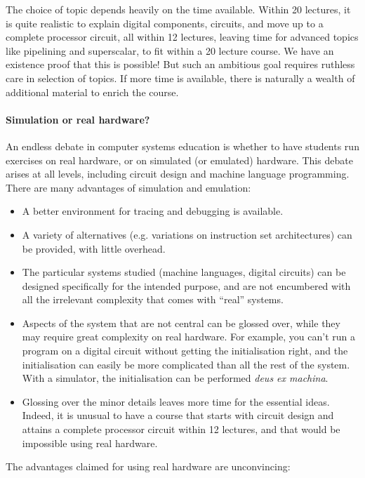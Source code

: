 \documentclass[submission,copyright,creativecommons]{eptcs}
\begin{document}
The choice of topic depends heavily on the time available.  Within
20 lectures, it is quite realistic to explain digital components,
circuits, and move up to a complete processor circuit, all within
12 lectures, leaving time for advanced topics like pipelining and
superscalar, to fit within a 20 lecture course.  We have an
existence proof that this is possible!  But such an ambitious goal
requires ruthless care in selection of topics.  If more time is
available, there is naturally a wealth of additional material to
enrich the course.

\paragraph{Simulation or real hardware?}
An endless debate in computer systems education is whether to have
students run exercises on real hardware, or on simulated (or
emulated) hardware.  This debate arises at all levels, including
circuit design and machine language programming.  There are many
advantages of simulation and emulation:
\begin{itemize}
\item A better environment for tracing and debugging is available.
\item A variety of alternatives (e.g. variations on instruction set
  architectures) can be provided, with little overhead.
\item The particular systems studied (machine languages, digital
  circuits) can be designed specifically for the intended purpose,
  and are not encumbered with all the irrelevant complexity that
  comes with ``real'' systems.
\item Aspects of the system that are not central can be glossed
  over, while they may require great complexity on real hardware.
  For example, you can't run a program on  a digital circuit
  without getting the initialisation right, and the initialisation
  can easily be more complicated than all the rest of the system.
  With a simulator, the initialisation can be performed \emph{deus
    ex machina}.
\item Glossing over the minor details leaves more time for the
  essential ideas.  Indeed, it is unusual to have a course that
  starts with circuit design and attains a complete processor
  circuit within 12 lectures, and that would be impossible using
  real hardware.
\end{itemize}
The advantages claimed for using real hardware are unconvincing:
\end{document}

